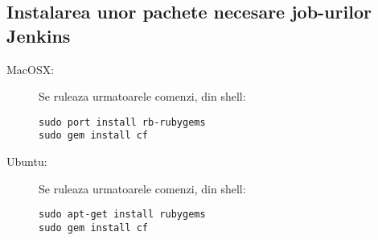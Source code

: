\subsection{Instalarea unor pachete necesare job-urilor Jenkins}
\begin{description}
\item[MacOSX:]
Se ruleaza urmatoarele comenzi, din shell:
\begin{lstlisting}[breaklines=true]
sudo port install rb-rubygems
sudo gem install cf
\end{lstlisting}

\item[Ubuntu:]
Se ruleaza urmatoarele comenzi, din shell:
\begin{lstlisting}[breaklines=true]
sudo apt-get install rubygems
sudo gem install cf
\end{lstlisting}
\end{description}
